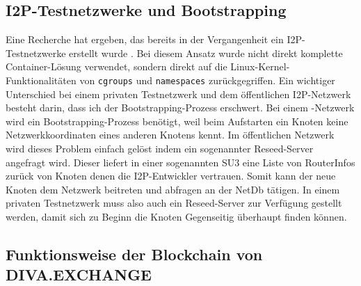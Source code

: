 %
%

\subsection{I2P-Testnetzwerke und Bootstrapping}\label{sec:bootstrapping}

Eine Recherche hat ergeben, das bereits in der Vergangenheit ein I2P-Testnetzwerke erstellt wurde \parencite{noauthor_how_2018}.
Bei diesem Ansatz wurde nicht direkt komplette Container-Lösung verwendet, sondern direkt auf die Linux-Kernel-Funktionalitäten von \lstinline|cgroups| und \lstinline|namespaces| zurückgegriffen.
Ein wichtiger Unterschied bei einem privaten Testnetzwerk und dem öffentlichen I2P-Netzwerk besteht darin, dass ich der Bootstrapping-Prozess erschwert.
Bei einem -Netzwerk wird ein Bootstrapping-Prozess benötigt, weil beim Aufstarten ein Knoten keine Netzwerkkoordinaten eines anderen Knotens kennt.
Im öffentlichen Netzwerk wird dieses Problem einfach gelöst indem ein sogenannter Reseed-Server angefragt wird.
Dieser liefert in einer sogenannten SU3 eine Liste von RouterInfos zurück von Knoten denen die I2P-Entwickler vertrauen.
Somit kann der neue Knoten dem Netzwerk beitreten und abfragen an der NetDb tätigen.
In einem privaten Testnetzwerk muss also auch ein Reseed-Server zur Verfügung gestellt werden, damit sich zu Beginn die Knoten Gegenseitig überhaupt finden können.

\subsection{Funktionsweise der Blockchain von DIVA.EXCHANGE}\label{sec:divachain}

